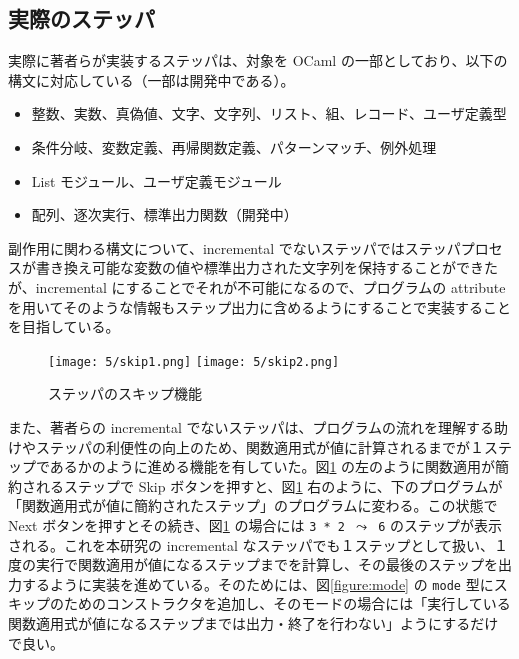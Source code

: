 \subsection{実際のステッパ}
\label{実装-実際のステッパ}

実際に著者らが実装するステッパは、対象を OCaml の一部としており、以下の構文に対応している（一部は開発中である）。
\begin{itemize}
\item 整数、実数、真偽値、文字、文字列、リスト、組、レコード、ユーザ定義型
\item 条件分岐、変数定義、再帰関数定義、パターンマッチ、例外処理
\item List モジュール、ユーザ定義モジュール
\item 配列、逐次実行、標準出力関数（開発中）
\end{itemize}

副作用に関わる構文について、incremental でないステッパ\cite{FCA19}ではステッパプロセスが書き換え可能な変数の値や標準出力された文字列を保持することができたが、incremental にすることでそれが不可能になるので、プログラムの attribute を用いてそのような情報もステップ出力に含めるようにすることで実装することを目指している。

\begin{figure}
  \texttt{[image: 5/skip1.png]}
  \texttt{[image: 5/skip2.png]}
  \caption{ステッパのスキップ機能}
  \label{figure:skip}
\end{figure}

また、著者らの incremental でないステッパ\cite{FCA19}は、プログラムの流れを理解する助けやステッパの利便性の向上のため、関数適用式が値に計算されるまでが１ステップであるかのように進める機能を有していた。図\ref{figure:skip} の左のように関数適用が簡約されるステップで Skip ボタンを押すと、図\ref{figure:skip} 右のように、下のプログラムが「関数適用式が値に簡約されたステップ」のプログラムに変わる。この状態で Next ボタンを押すとその続き、図\ref{figure:skip} の場合には \texttt{3 * 2 $\leadsto$ 6} のステップが表示される。これを本研究の incremental なステッパでも１ステップとして扱い、１度の実行で関数適用が値になるステップまでを計算し、その最後のステップを出力するように実装を進めている。そのためには、図\ref{figure:mode} の \texttt{mode} 型にスキップのためのコンストラクタを追加し、そのモードの場合には「実行している関数適用式が値になるステップまでは出力・終了を行わない」ようにするだけで良い。
